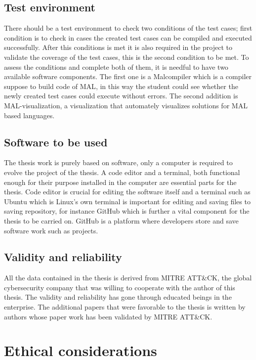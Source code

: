 \documentclass[english]{kththesis}
\begin{document}
\subsection{Test environment}
\noindent There should be a test environment to check two conditions of the test cases; first condition is to check in cases the created test cases can be compiled and executed successfully. After this conditions is met it is also required in the project to validate the coverage of the test cases, this is the second condition to be met. To assess the conditions and complete both of them, it is needful to have two available software components. The first one is a Malcompiler which is a compiler suppose to build code of \gls{MAL}, in this way the student could see whether the newly created test cases could execute without errors. The second addition is \gls{MAL}-visualization, a visualization that automately visualizes solutions for \gls{MAL} based languages.

\subsection{Software to be used}
\noindent The thesis work is purely based on software, only a computer is required to evolve the project of the thesis. A code editor and a terminal, both functional enough for their purpose installed in the computer are essential parts for the thesis. Code editor is crucial for editing the software itself and a terminal such as Ubuntu which is Linux's own terminal is important for editing and saving files to saving repository, for instance GitHub which is further a vital component for the thesis to be carried on. GitHub is a platform where developers store and save software work such as projects.

\subsection{Validity and reliability}
All the data contained in the thesis is derived from MITRE ATT\&CK, the global cybersecurity company that was willing to cooperate with the author of this thesis. The validity and reliability has gone through educated beings in the enterprise. The additional papers that were favorable to the thesis is written by authors whose paper work has been validated by MITRE ATT\&CK.

\section{Ethical considerations}
\label{sec:ethicalConsiderations}
 
\end{document}
